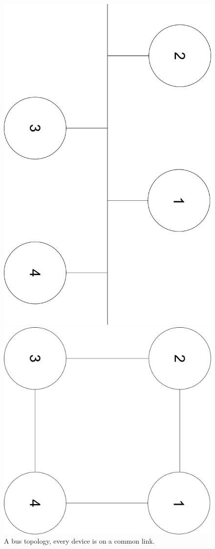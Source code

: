 \documentclass[10pt,a4paper]{article}
\begin{document}
\begin{figure}[H]
  \includegraphics[angle=90,width=\linewidth]{BUS}
  \caption{A bus topology, every device is on a common link.}\label{fig:BUS}
\endminipage\hfill
{}%
  \includegraphics[angle=90,width=\linewidth]{RING}

\end{figure}
\end{document}
